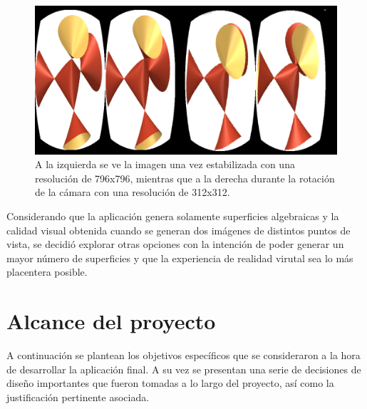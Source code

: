\documentclass[12pt]{article}
\begin{document}
\clearpage
\begin{figure}[h!]
\includegraphics[width=\textwidth]{se_puede_doble.png}
\caption{A la izquierda se ve la imagen una vez estabilizada con una resolución de 796x796, mientras que a la derecha durante la rotación de la cámara con una resolución de 312x312.}
\end{figure}
Considerando que la aplicación genera solamente superficies algebraicas y la calidad visual obtenida cuando se generan dos imágenes de distintos puntos de vista, se decidió explorar otras opciones con la intención de poder generar un mayor número de superficies y que la experiencia de realidad virutal sea lo más placentera posible.
\clearpage
\section{Alcance del proyecto}
A continuación se plantean los objetivos específicos que se consideraron a la hora de desarrollar la aplicación final. A su vez se presentan una serie de decisiones de diseño importantes que fueron tomadas a lo largo del proyecto, así como la justificación pertinente asociada.
\end{document}

